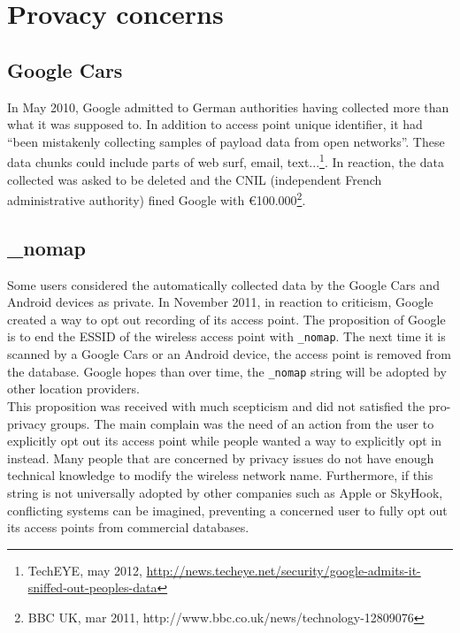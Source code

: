 
\section{Provacy concerns}
\label{sec:andro-priv}

\subsection{Google Cars}
In May 2010, Google admitted to German authorities having collected more than what it was supposed to.
In addition to access point unique identifier, it had ``been mistakenly collecting samples of payload data from open networks''.
These data chunks could include parts of web surf, email, text...\footnote{TechEYE, may 2012, \url{http://news.techeye.net/security/google-admits-it-sniffed-out-peoples-data}}.
In reaction, the data collected was asked to be deleted and the CNIL (independent French administrative authority) fined Google with €100.000\footnote{BBC UK, mar 2011, http://www.bbc.co.uk/news/technology-12809076}.\\

\subsection{\_nomap}

Some users considered the automatically collected data by the Google Cars and Android devices as private.
In November 2011, in reaction to criticism, Google created a way to opt out recording of its access point.
The proposition of Google is to end the ESSID of the wireless access point with \texttt{\_nomap}.
The next time it is scanned by a Google Cars or an Android device, the access point is removed from the database.
Google hopes than over time, the \texttt{\_nomap} string will be adopted by other location providers\cite{nomap}.\\

This proposition was received with much scepticism and did not satisfied the pro-privacy groups.
The main complain was the need of an action from the user to explicitly opt out its access point while people wanted a way to explicitly opt in instead.
Many people that are concerned by privacy issues do not have enough technical knowledge to modify the wireless network name.
Furthermore, if this string is not universally adopted by other companies such as Apple or SkyHook, conflicting systems can be imagined, preventing a concerned user to fully opt out its access points from commercial databases.

